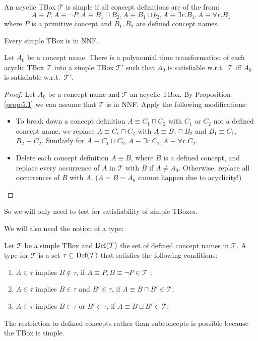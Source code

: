 \begin{definition*}
	An acyclic TBox $\mathcal{T}$ is simple if all concept definitions are of the from:
	\[
	A \equiv P, A \equiv \neg P, A \equiv B_1 \sqcap B_2, A \equiv B_1 \sqcup b_2, A \equiv \exists r.B_1, A \equiv \forall r.B_1
	\]
	where $P$ is a primitive concept and $B_1, B_2$ are defined concept names.
\end{definition*}
\begin{note}
	Every simple TBox is in NNF.
\end{note}

\begin{lemma}\label{lem:5.2}
	Let $A_0$ be a concept name.
	There is a polynomial time transformation of each acyclic TBox $\mathcal{T}$
	into a simple TBox $\mathcal{T}'$ such that $A_0$ is satisfiable w.r.t.\ $\mathcal{T}$ 
	iff $A_0$ is satisfiable w.r.t.\ $\mathcal{T}'$.
\end{lemma}
\begin{proof}
	Let $A_0$ be a concept name and $\mathcal{T}$ an acyclic TBox.
	By Proposition \ref{prop:5.1} we can assume that $\mathcal{T}$ is in NNF.
	Apply the following modifications:
	\begin{itemize}
		\item To break down a concept definition $A \equiv C_1 \sqcap C_2$
			with $C_1$ or $C_2$ not a defined concept name,
			we replace $A \equiv C_1 \sqcap C_2$ with $A \equiv B_1 \sqcap B_2$ 
			and $B_1 \equiv C_1$, $B_2 \equiv C_2$.
			Similarly for $A \equiv C_1 \sqcup C_2, A \equiv \exists r.C_1, A \equiv \forall r.C_2$.
		\item Delete each concept definition $A \equiv B$, where $B$ is a defined concept,
			and replace every occurrence of $A$ in $\mathcal{T}$ with $B$ if $A \neq A_0$.
			Otherwise, replace all occurrences of $B$ with $A$.
			($A = B = A_0$ cannot happen due to acyclicity!)
			\qedhere
	\end{itemize}
\end{proof}
So we will only need to test for satisfiability of simple TBoxes.

We will also need the notion of a type:
\begin{definition}[Type]
	Let $\mathcal{T}$ be a simple TBox and $\operatorname{\text{Def}}(\mathcal{T})$ the set of defined concept names in $\mathcal{T}$.
	A type for $\mathcal{T}$ is a set $\tau \subseteq \operatorname{\text{Def}}(\mathcal{T})$
	that satisfies the following conditions:
	\begin{enumerate}
		\item $A \in \tau$ implies $B \notin \tau$, if $A \equiv P, B \equiv \neg P \in \mathcal{T}$ ;
		\item $A \in \tau$ implies $B \in \tau$ and $B' \in \tau$, if $A \equiv B \sqcap B' \in \mathcal{T}$;
		\item $A \in \tau$ implies $B \in \tau$ or $B' \in \tau$, if $A \equiv B \sqcup B' \in \mathcal{T}$;
	\end{enumerate}
\end{definition}
\begin{note}
	The restriction to defined concepts rather than subconcepts is possible because the TBox is simple.
\end{note}

